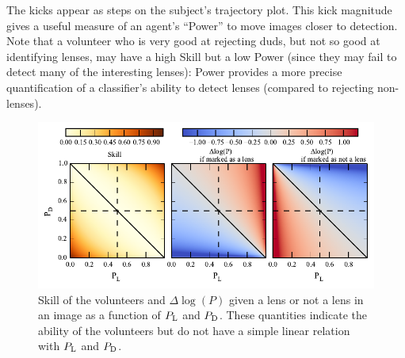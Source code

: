 \documentclass[useAMS,usenatbib,a4paper]{mn2e}
\begin{document}
The kicks appear as steps on the subject's trajectory plot. This kick
magnitude gives a useful measure of an agent's ``Power'' to move
images closer to detection.  Note that a volunteer who is very good at
rejecting duds, but not so good at identifying lenses, may have a high
Skill but a low Power (since they may fail to detect many of the
interesting lenses): Power provides a more precise quantification of a
classifier's ability to detect lenses (compared to rejecting non-lenses).


\begin{figure}
\begin{center}
\includegraphics[scale=1.0]{sw-cfhtls-figs/dlnp_skill.pdf}
\caption{ \label{fig:skilldlnp}
Skill of the volunteers and $\Delta\log(P)$ given a lens or not a lens in
an image as a function of $P_{\rm L}$ and $P_{\rm D}$. These
quantities indicate the ability of the volunteers but do not have a simple
linear relation with $P_{\rm L}$ and $P_{\rm D}$.
}
\end{center}
\end{figure}







% 






\label{lastpage}
\bsp
\end{document}
